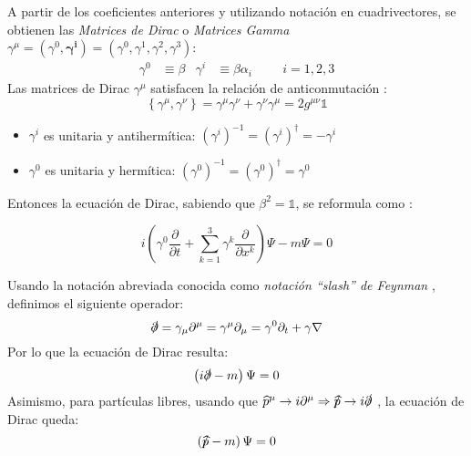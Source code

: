 A partir de los coeficientes anteriores y utilizando notación en cuadrivectores, se obtienen las \textit{Matrices de Dirac} o \textit{Matrices Gamma}  $\gamma^{\mu}=(\gamma^0, \boldsymbol{\gamma^{i}})=(\gamma^0, \gamma^1, \gamma^2, \gamma^3)$:
\begin{align}
\gamma ^0 &\equiv \beta & \gamma ^i &\equiv \beta \alpha_i \hspace{1cm} i=1, 2, 3 \label{eq:matricesDirac}
\end{align}
Las matrices de Dirac $\gamma^{\mu}$ satisfacen la relación de anticonmutación \cite{MCR}:
\begin{equation}
\left\{ \gamma ^{\mu },\gamma ^{\nu }\right\} =\gamma ^{\mu }\gamma ^{\nu }+\gamma ^{\nu }\gamma ^{\mu }=2g^{\mu \nu }\mathbb{1}\label{eq:anticomm_relation}
\end{equation}
\begin{itemize}
\item $\gamma^{i}$ es unitaria y antihermítica: $\left( \gamma ^{i}\right) ^{-1}=\left( \gamma ^{i}\right) ^{\dagger}=-\gamma ^{i}$
\item $\gamma^{0}$ es unitaria y hermítica: $\left( \gamma ^{0}\right) ^{-1}=\left( \gamma ^{0}\right) ^{\dagger}=\gamma ^{0}$
\end{itemize}

Entonces la ecuación de Dirac, sabiendo que $\beta^2=\mathbb{1}$, se reformula como \cite{MCR}:

\begin{equation}
i\left( \gamma ^{0}\dfrac{\partial }{\partial t}+\sum ^{3}_{k=1}\gamma ^{k}\dfrac{\partial }{\partial x^{k}}\right) \Psi -m\Psi =0\label{eq:ecDirac_cov}
\end{equation}

Usando la notación abreviada conocida como \textit{notación ``slash'' de Feynman} \cite{MCR}, definimos el siguiente operador:
\begin{equation}
\slashed{\partial}=\gamma_{\mu }\partial ^{\mu }=\gamma ^{\mu }\partial _{\mu }=\gamma ^{0}\partial _{t}+\gamma \nabla\label{eq:slashnot}
\end{equation}
Por lo que la ecuación de Dirac resulta:
\begin{equation}
\left(i \slashed{\partial}-m\right) \Psi =0\label{eq:Dirac_final}
\end{equation}
Asimismo, para partículas libres, usando que $\widehat{p}^{\mu} \rightarrow i\partial^{\mu} \Rightarrow \slashed{\widehat{p}} \rightarrow i\slashed{\partial}$ \cite{MCR}, la ecuación de Dirac queda:
\begin{equation}
\left( \slashed{\widehat{p}}-m\right) \Psi =0\label{eq:Dirac_free}
\end{equation}

